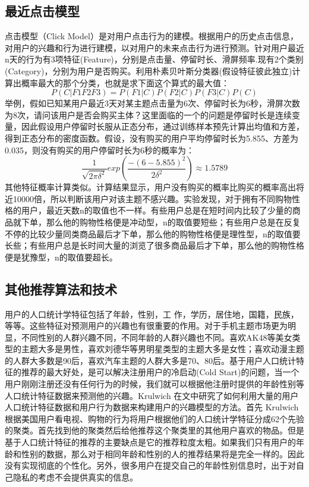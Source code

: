 		\subsection{最近点击模型}
		点击模型（Click Model）是对用户点击行为的建模。根据用户的历史点击信息，对用户的兴趣和行为进行建模，以对用户的未来点击行为进行预测。针对用户最近n天的行为有3项特征(Feature)，分别是点击量、停留时长、滑屏频率.现有2个类别(Category)，分别为用户是否购买。利用朴素贝叶斯分类器(假设特征彼此独立)计算出概率最大的那个分类，也就是求下面这个算式的最大值：
		\begin{equation}
			P(C|F1F2F3) = P(F1|C)P(F2|C)P(F3|C)P(C)
			\label{F-Measure}
		\end{equation}
		举例，假如已知某用户最近3天对某主题点击量为6次、停留时长为6秒，滑屏次数为8次，请问该用户是否会购买主体？这里面临的一个的问题是停留时长是连续变量，因此假设用户停留时长服从正态分布，通过训练样本预先计算出均值和方差，得到正态分布的密度函数。假设，没有购买的用户平均停留时长为5.855、方差为0.035，则没有购买的用户停留时长为6秒的概率为：
		\begin{equation}
			\frac{1}{\sqrt{2\pi \delta ^2}}exp\left ( \frac{-(6-5.855)^{2}}{2\delta ^{2}} \right ) \approx 1.5789
			\label{exponent}
		\end{equation}
		其他特征概率计算类似。计算结果显示，用户没有购买的概率比购买的概率高出将近10000倍，所以判断该用户对该主题不感兴趣。实验发现，对于拥有不同购物性格的用户，最近天数n的取值也不一样。有些用户总是在短时间内比较了少量的商品就下单，那么他的购物性格便是冲动型，n的取值要短些；有些用户总是在反复不停的比较少量同类商品最后才下单，那么他的购物性格便是理性型，n的取值要长些；有些用户总是长时间大量的浏览了很多商品最后才下单，那么他的购物性格便是犹豫型，n的取值要超长。

		\subsection{其他推荐算法和技术}
		用户的人口统计学特征包括了年龄，性别，工 作，学历，居住地，国籍，民族，等等。这些特征对预测用户的兴趣也有很重要的作用。对于手机主题市场更为明显，不同性别的人群兴趣不同，不同年龄的人群兴趣也不同。喜欢AK48等美女类型的主题大多是男性，喜欢刘德华等男明星类型的主题大多是女性；喜欢动漫主题的人群大多数是90后，喜欢汽车主题的人群大多是70、80后。基于用户人口统计特征的推荐的最大好处，是可以解决注册用户的冷启动(Cold Start)的问题，当一个用户刚刚注册还没有任何行为的时候，我们就可以根据他注册时提供的年龄性别等人口统计特征数据来预测他的兴趣。Krulwich 在文中\citep{demo-data}研究了如何利用大量的用户人口统计特征数据和用户行为数据来构建用户的兴趣模型的方法。首先 Krulwich 根据美国用户看电视、购物的行为将用户根据他们的人口统计学特征分成62个先验的聚类。首先找到他的聚类然后给他推荐这个聚类里的其他用户喜欢的物品。但是基于人口统计特征的推荐的主要缺点是它的推荐粒度太粗。如果我们只有用户的年龄和性别的数据，那么对于相同年龄和性别的人的推荐结果将是完全一样的。因此没有实现彻底的个性化。另外，很多用户在提交自己的年龄性别信息时，出于对自己隐私的考虑不会提供真实的信息。

